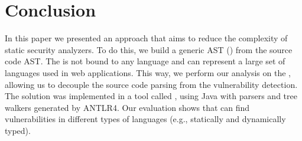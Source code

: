 \section{Conclusion}
In this paper we presented an approach that aims to reduce the complexity of static security analyzers. To do this, we build a generic AST (\astname{}) from the source code AST. The \astname{} is not bound to any language and can represent a large set of languages used in web applications. This way, we perform our analysis on the \astname{}, allowing us to decouple the source code parsing from the vulnerability detection. The solution was implemented in a tool called \toolname{}, using Java with parsers and tree walkers generated by ANTLR4. Our evaluation shows that \toolname{} can find vulnerabilities in different types of languages (e.g., statically and dynamically typed).